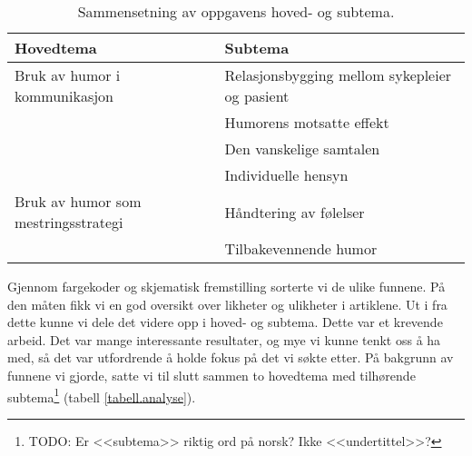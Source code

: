 \begin{table}
  \centering
  \small
  \begin{tabular}{@{}ll@{}}
    \toprule
    \textbf{Hovedtema} & \textbf{Subtema} \\
    \midrule
    Bruk av humor i kommunikasjon
      & Relasjonsbygging mellom sykepleier og pasient \\
      & Humorens motsatte effekt \\
      & Den vanskelige samtalen \\
      & Individuelle hensyn \\
    \midrule
    Bruk av humor som mestringsstrategi
      & Håndtering av følelser \\
      & Tilbakevennende humor \\
    \bottomrule
  \end{tabular}
  \label{tabell.analyse}
  \caption{Sammensetning av oppgavens hoved- og subtema.}
\end{table}

Gjennom fargekoder og skjematisk fremstilling sorterte vi de ulike funnene. På
den måten fikk vi en god oversikt over likheter og ulikheter i artiklene. Ut i
fra dette kunne vi dele det videre opp i hoved- og subtema. Dette var et
krevende arbeid. Det var mange interessante resultater, og mye vi kunne tenkt
oss å ha med, så det var utfordrende å holde fokus på det vi søkte etter. På
bakgrunn av funnene vi gjorde, satte vi til slutt sammen to hovedtema med
tilhørende subtema\footnote{TODO: Er <<subtema>> riktig ord på norsk? Ikke
<<undertittel>>?} (tabell \vref{tabell.analyse}).
